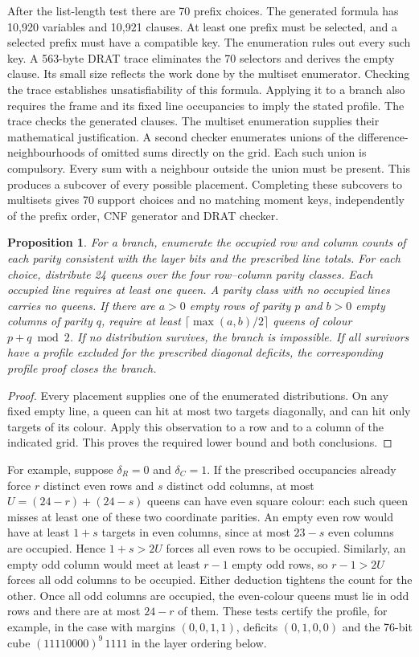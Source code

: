 \documentclass[11pt]{article}
\newtheorem{proposition}[theorem]{Proposition}
\begin{document}
After the list-length test there are 70 prefix choices. The generated
formula has 10,920 variables and 10,921 clauses. At least one prefix must
be selected, and a selected prefix must have a compatible key. The
enumeration rules out every such key. A 563-byte DRAT trace eliminates the
70 selectors and derives the empty clause. Its small size reflects the
work done by the multiset enumerator. Checking the trace establishes
unsatisfiability of this formula. Applying it to a branch also requires
the frame and its fixed line occupancies to imply the stated profile.
The trace checks the generated clauses. The multiset enumeration supplies
their mathematical justification. A second checker enumerates unions
of the difference-neighbourhoods of omitted sums directly on the grid.
Each such union is compulsory. Every sum with a neighbour outside the
union must be present. This produces a subcover of every possible
placement. Completing these subcovers to multisets gives 70 support
choices and no matching moment keys, independently of the prefix order,
CNF generator and DRAT checker.

\begin{proposition}\label{prop:axis}
For a branch, enumerate the occupied row and column counts of each parity
consistent with the layer bits and the prescribed line totals. For each
choice, distribute 24 queens over the four row--column parity classes.
Each occupied line requires at least one queen. A parity class with no
occupied lines carries no queens. If there are $a>0$ empty rows of parity $p$ and $b>0$
empty columns of parity $q$, require at least $\lceil\max(a,b)/2\rceil$
queens of colour $p+q\bmod 2$. If no distribution survives, the branch
is impossible. If all survivors have a profile excluded for the prescribed diagonal
deficits, the corresponding profile proof closes the branch.
\end{proposition}
\begin{proof}
Every placement supplies one of the enumerated distributions. On any fixed
empty line, a queen can hit at most two targets diagonally, and can hit
only targets of its colour. Apply this observation to a row and to a
column of the indicated grid. This proves the required lower bound and
both conclusions.
\end{proof}

For example, suppose $\delta_R=0$ and $\delta_C=1$. If the prescribed
occupancies already force $r$ distinct even rows and $s$ distinct odd
columns, at most $U=(24-r)+(24-s)$ queens can have even square colour:
each such queen misses at least one of these two coordinate parities.
An empty even row would have at least $1+s$ targets in even columns,
since at most $23-s$ even columns are occupied. Hence $1+s>2U$ forces
all even rows to be occupied. Similarly, an empty odd column would meet
at least $r-1$ empty odd rows, so $r-1>2U$ forces all odd columns to
be occupied. Either deduction tightens the count for the other. Once
all odd columns are occupied, the even-colour queens must lie in odd
rows and there are at most $24-r$ of them. These tests certify the
profile, for example, in the case with margins $(0,0,1,1)$, deficits
$(0,1,0,0)$ and the 76-bit cube $(11110000)^9\,1111$ in the layer
ordering below.
\end{document}
